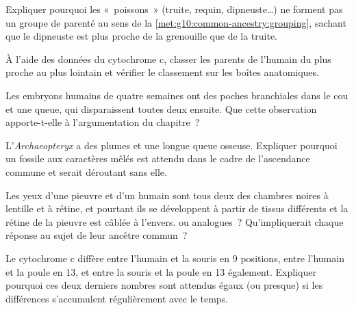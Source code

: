 \begin{exercise}[$\star\star$]\label{exo:g10:common-ancestry:8}
Expliquer pourquoi les «~poissons~» (truite, requin, dipneuste\dots) ne
forment pas un groupe de parenté au sens de la
\cref{met:g10:common-ancestry:grouping}, sachant que le dipneuste est
plus proche de la grenouille que de la truite.
\end{exercise}

\begin{exercise}[$\star\star$]\label{exo:g10:common-ancestry:9}
À l'aide des données du cytochrome c, classer les parents de l'humain
du plus proche au plus lointain et vérifier le classement sur les
boîtes anatomiques.
\end{exercise}

\begin{exercise}[$\star\star$]\label{exo:g10:common-ancestry:10}
Les embryons humains de quatre semaines ont des poches branchiales dans
le cou et une queue, qui disparaissent toutes deux ensuite. Que cette
observation apporte-t-elle à l'argumentation du chapitre~?
\end{exercise}

\begin{exercise}[$\star\star$]\label{exo:g10:common-ancestry:11}
L'\emph{Archaeopteryx} a des plumes et une longue queue osseuse.
Expliquer pourquoi un fossile aux caractères mêlés est attendu dans le
cadre de l'ascendance commune et serait déroutant sans elle.
\end{exercise}

\begin{exercise}[$\star\star\star$]\label{exo:g10:common-ancestry:12}
Les yeux d'une pieuvre et d'un humain sont tous deux des chambres
noires à lentille et à rétine, et pourtant ils se développent à partir
de tissus différents et la rétine de la pieuvre est câblée à l'envers.
 ou analogues~? Qu'impliquerait chaque réponse au sujet de
leur ancêtre commun~?
\end{exercise}

\begin{exercise}[$\star\star\star$]\label{exo:g10:common-ancestry:13}
Le cytochrome c diffère entre l'humain et la souris en 9 positions,
entre l'humain et la poule en 13, et entre la souris et la poule en 13
également. Expliquer pourquoi ces deux derniers nombres sont attendus
égaux (ou presque) si les différences s'accumulent régulièrement avec
le temps.
\end{exercise}

